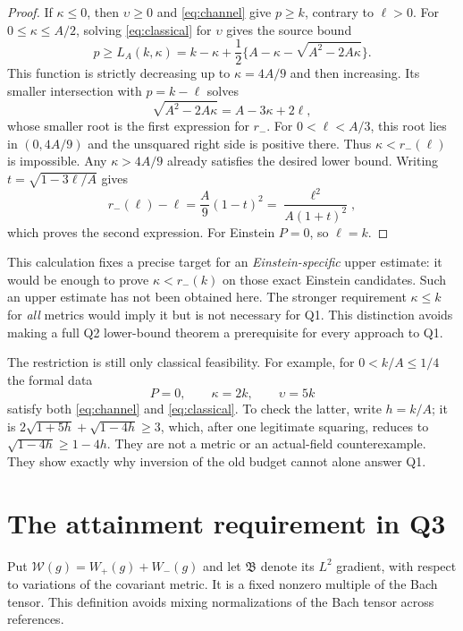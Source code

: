 \documentclass[11pt,a4paper]{article}
\numberwithin{equation}{section}
\theoremstyle{definition}\newtheorem{hypothesis}[theorem]{Input}
\theoremstyle{remark}\newtheorem{remark}[theorem]{Remark}
\begin{document}
\begin{proof}
If $\kappa\le0$, then $\upsilon\ge0$ and \eqref{eq:channel} give $p\ge k$,
contrary to $\ell>0$.  For $0\le\kappa\le A/2$, solving
\eqref{eq:classical} for $\upsilon$ gives the source bound
\[
 p\ge L_A(k,\kappa)
 =k-\kappa+\frac12\{A-\kappa-\sqrt{A^2-2A\kappa}\}.
\]
This function is strictly decreasing up to $\kappa=4A/9$ and then
increasing.  Its smaller intersection with $p=k-\ell$ solves
\[
 \sqrt{A^2-2A\kappa}=A-3\kappa+2\ell,
\]
whose smaller root is the first expression for $r_-$.  For
$0<\ell<A/3$, this root lies in $(0,4A/9)$ and the unsquared right side is
positive there.  Thus $\kappa<r_-(\ell)$ is impossible.  Any $\kappa>4A/9$
already satisfies the desired lower bound.  Writing
$t=\sqrt{1-3\ell/A}$ gives
\[
 r_-(\ell)-\ell=\frac A9(1-t)^2
 =\frac{\ell^2}{A(1+t)^2},
\]
which proves the second expression.  For Einstein $P=0$, so $\ell=k$.
\end{proof}

This calculation fixes a precise target for an \emph{Einstein-specific}
upper estimate: it would be enough to prove $\kappa<r_-(k)$ on those exact
Einstein candidates.  Such an upper estimate has not been obtained here.
The stronger requirement $\kappa\le k$ for \emph{all} metrics would imply
it but is not necessary for Q1.  This distinction avoids making a full Q2
lower-bound theorem a prerequisite for every approach to Q1.

The restriction is still only classical feasibility.  For example, for
$0<k/A\le1/4$ the formal data
\begin{equation}
 P=0,\qquad \kappa=2k,\qquad \upsilon=5k
\end{equation}
satisfy both \eqref{eq:channel} and \eqref{eq:classical}.  To check the latter,
write $h=k/A$; it is
$2\sqrt{1+5h}+\sqrt{1-4h}\ge3$, which, after one legitimate squaring,
reduces to $\sqrt{1-4h}\ge1-4h$.
They are not a metric or an actual-field counterexample.  They show exactly
why inversion of the old budget cannot alone answer Q1.

\section{The attainment requirement in Q3}

Put $\mathcal W(g)=W_+(g)+W_-(g)$ and let $\mathfrak B$ denote its
$L^2$ gradient, with respect to variations of the covariant metric.  It is
a fixed nonzero multiple of the Bach tensor.  This definition avoids mixing
normalizations of the Bach tensor across references.
\end{document}
